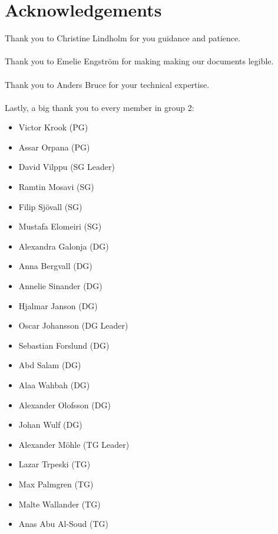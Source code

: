 \documentclass{article}
\begin{document}
\section{Acknowledgements}
    Thank you to Christine Lindholm for you guidance and patience. \\ \\
    Thank you to Emelie Engström for making making our documents legible. \\ \\
    Thank you to Anders Bruce for your technical expertise. \\ \\
    Lastly, a big thank you to every member in group 2:
    \begin{itemize}
        \item Victor Krook (PG)
        \item Assar Orpana (PG)
        \item David Vilppu (SG Leader)
        \item Ramtin Mosavi (SG)
        \item Filip Sjövall (SG)
        \item Mustafa Elomeiri (SG)
        \item Alexandra Galonja (DG)
        \item Anna Bergvall (DG)
        \item Annelie Sinander (DG)
        \item Hjalmar Janson (DG)
        \item Oscar Johansson (DG Leader)
        \item Sebastian Forslund (DG)
        \item Abd Salam (DG)
        \item Alaa Wahbah (DG)
        \item Alexander Olofsson (DG)
        \item Johan Wulf (DG)
        \item Alexander Möhle (TG Leader)
        \item Lazar Trpeski (TG)
        \item Max Palmgren (TG)
        \item Malte Wallander (TG)
        \item Anas Abu Al-Soud (TG)
    \end{itemize}
\end{document}
